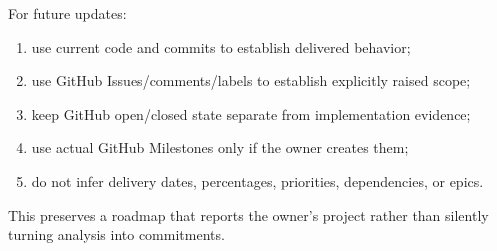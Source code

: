 \documentclass[11pt]{article}
\begin{document}
For future updates:

\begin{enumerate}
  \item use current code and commits to establish delivered behavior;
  \item use GitHub Issues/comments/labels to establish explicitly raised scope;
  \item keep GitHub open/closed state separate from implementation evidence;
  \item use actual GitHub Milestones only if the owner creates them;
  \item do not infer delivery dates, percentages, priorities, dependencies, or epics.
\end{enumerate}

This preserves a roadmap that reports the owner's project rather than silently
turning analysis into commitments.
\end{document}
